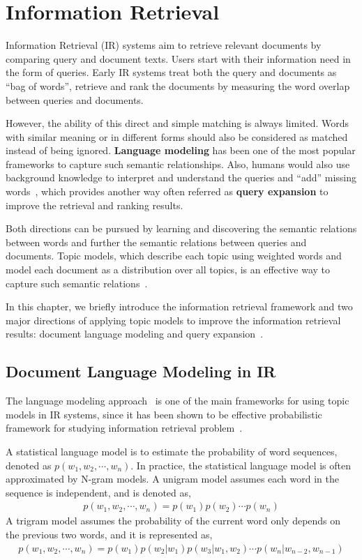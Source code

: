 \chapter{Information Retrieval}
\label{ch:ir}

Information Retrieval (IR) systems aim to retrieve relevant documents by comparing query and document texts. Users start with their information need in the form of queries. Early IR systems treat both the query and documents as ``bag of words'', retrieve and rank the documents by measuring the word overlap between queries and documents. 

However, the ability of this direct and simple matching is always limited. Words with similar meaning or in different forms should also be considered as matched instead of being ignored. \textbf{Language modeling} has been one of the most popular frameworks to capture such semantic relationships. Also, humans would also use background knowledge to interpret and understand the queries and ``add'' missing words~\citep{wei-07}, which provides another way often referred as \textbf{query expansion} to improve the retrieval and ranking results.

Both directions can be pursued by learning and discovering the semantic relations between words and further the semantic relations between queries and documents. Topic models, which describe each topic using weighted words and model each document as a distribution over all topics, is an effective way to capture such semantic relations~\citep{deerwester-90,hofmann-99a}.

In this chapter, we briefly introduce the information retrieval framework and two major directions of applying topic models to improve the information retrieval results: document language modeling \citep{Lu-2011,wei-06} and query expansion~\citep{Park-2009,Andrzejewski-2011}.

\section{Document Language Modeling in IR}

The language modeling approach~\citep{croft-03,PonteCroft,song-99} is one of the main frameworks for using topic models in IR systems, since it has been shown to be effective probabilistic framework for studying information retrieval problem~\citep{PonteCroft,berger-99}.

A statistical language model is to estimate the probability of word sequences, denoted as $p(w_1,w_2,\cdots,w_n)$. In practice, the statistical language model is often approximated by N-gram models. A unigram model assumes each word in the sequence is independent, and is denoted as,
\begin{align}
p(w_1,w_2,\cdots,w_n) = p(w_1)p(w_2) \cdots p(w_n)
\end{align}
A trigram model assumes the probability of the current word only depends on the previous two words, and it is represented as,
\begin{align}
p(w_1,w_2,\cdots,w_n)=p(w_1)p(w_2|w_1)p(w_3|w_1,w_2)\cdots p(w_n|w_{n-2},w_{n-1})
\end{align}

